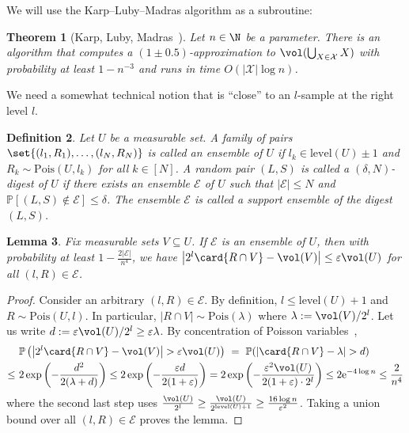 \documentclass[a4paper, 11pt]{article}
\newtheorem{theorem}{Theorem}[section]
\newtheorem{lemma}[theorem]{Lemma}
\newtheorem{definition}[theorem]{Definition}
\newcommand{\Pois}{\mathrm{Pois}}
\newcommand{\level}{\mathrm{level}}
\newcommand{\eps}{\varepsilon}
\renewcommand{\Pr}{\mathbb{P}}
\newcommand{\class}[1]{\mathcal{#1}}
\begin{document}
We will use the Karp--Luby--Madras algorithm as a subroutine:

\begin{theorem}[Karp, Luby, Madras~\cite{KarpLM89}]
    \label{thm:KLM}
    Let $n \in \N$ be a parameter. There is an algorithm \KLM{$\class{X}$} that computes a $(1\pm 0.5)$-approximation to $\vol(\bigcup_{X \in \class{X}} X)$ with probability at least $1 - n^{-3}$ and runs in time $O(|\class{X}| \log n)$.
\end{theorem}

\noindent
We need a somewhat technical notion that is ``close'' to an $l$-sample at the right level $l$.
\begin{definition}
    \label{def:digest}
    Let $U$ be a measurable set. A family of pairs $\set{(l_1,R_1), \dots, (l_N, R_N)}$ is called an \emph{ensemble} of $U$ if $l_k \in \level(U) \pm 1$ and $R_k \sim \Pois(U,l_k)$ for all $k \in [N]$.
    A random pair $(L,S)$ is called a \emph{$(\delta,N)$-digest} of $U$ if there exists an ensemble $\class{E}$ of $U$ such that $|\class{E}| \leq N$ and $\Pr[(L,S) \notin \class{E}] \leq \delta$. The ensemble $\class{E}$ is called a \emph{support ensemble} of the digest $(L,S)$.
\end{definition}

\begin{lemma}
    \label{lem:ensemble}
    Fix measurable sets $V \subseteq U$. If $\class{E}$ is an ensemble of $U$, then with probability at least $1 - \frac{2|\class{E}|}{n^4}$, we have $\left| 2^l \card{R \cap V} - \vol(V) \right| \leq \eps \vol(U)$ for all $(l,R) \in \class{E}$.
\end{lemma}

\begin{proof}
    Consider an arbitrary $(l,R) \in \class{E}$. By definition, $l \leq \level(U)+1$ and $R \sim \Pois(U,l)$. In particular, $|R \cap V| \sim \Pois(\lambda)$ where $\lambda := \vol(V)/2^l$. Let us write $d := \eps \vol(U) / 2^l \geq \eps \lambda$. By concentration of Poisson variables~\cite{Canonne19},
    \begin{align*}
        & \Pr\left( \left| 2^l \card{R \cap V} - \vol(V) \right| > \eps \vol(U) \right) \ 
        =\ \Pr( \left| \card{R \cap V} - \lambda \right| > d ) \\
        \leq\ & 2 \exp \left( -\frac{d^2}{2 (\lambda + d)} \right) 
        \leq 2 \exp \left( - \frac{\eps d}{2 (1 + \eps)} \right)
        = 2 \exp \left( - \frac{\eps^2 \vol(U)}{2(1 + \eps)\cdot 2^l} \right)
        \leq 2 \mathrm{e}^{-4 \log n}
        \le \frac{2}{n^4}
    \end{align*}
    where the second last step uses $\frac{\vol(U)}{2^l} \geq \frac{\vol(U)}{2^{\level(U)+1}} \geq \frac{16 \log n}{\eps^2}$. Taking a union bound over all $(l,R) \in \class{E}$ proves the lemma.
\end{proof}
\end{document}
